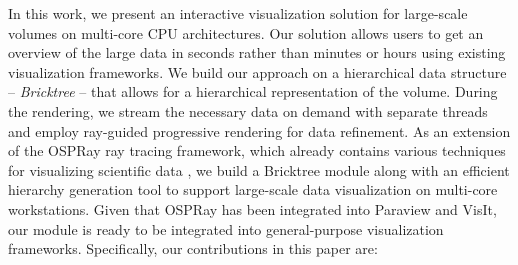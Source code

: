 



In this work, we present an interactive visualization solution for large-scale
volumes on multi-core CPU architectures. Our solution allows users to get an overview of the large
data in seconds rather than minutes or hours using existing visualization frameworks. 
We build our approach on a hierarchical data structure -- \textit{Bricktree} -- that allows
for a hierarchical representation of the volume. During the rendering, we stream the
necessary data on demand with separate threads and employ ray-guided progressive
rendering for data refinement. As an extension of the OSPRay ray tracing 
framework, which already contains various techniques for visualizing scientific data \cite{wald2017ospray,wang2018cpu}, we build a Bricktree
module along with an efficient hierarchy generation tool to support large-scale data
visualization on multi-core workstations. Given that OSPRay has been integrated into
Paraview and VisIt, our module is ready to be integrated into general-purpose
visualization frameworks. Specifically, our contributions in this paper are:

